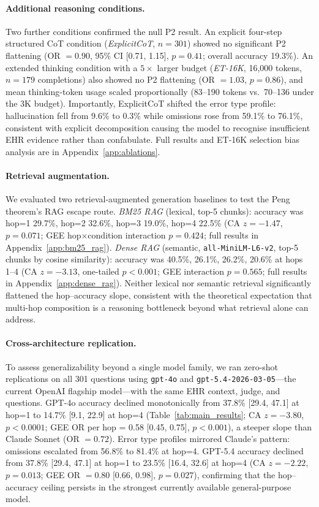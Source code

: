 \documentclass{article}
\begin{document}
\paragraph{Additional reasoning conditions.}
Two further conditions confirmed the null P2 result. An explicit four-step structured CoT condition (\textit{ExplicitCoT}, $n = 301$) showed no significant P2 flattening (OR $= 0.90$, 95\% CI [0.71, 1.15], $p = 0.41$; overall accuracy 19.3\%). An extended thinking condition with a $5\times$ larger budget (\textit{ET-16K}, 16{,}000 tokens, $n = 179$ completions) also showed no P2 flattening (OR $= 1.03$, $p = 0.86$), and mean thinking-token usage scaled proportionally (83--190 tokens vs.\ 70--136 under the 3K budget). Importantly, ExplicitCoT shifted the error type profile: hallucination fell from 9.6\% to 0.3\% while omissions rose from 59.1\% to 76.1\%, consistent with explicit decomposition causing the model to recognise insufficient EHR evidence rather than confabulate. Full results and ET-16K selection bias analysis are in Appendix~\ref{app:ablations}.

\paragraph{Retrieval augmentation.}
We evaluated two retrieval-augmented generation baselines to test the Peng theorem's RAG escape route.
\textit{BM25 RAG} (lexical, top-5 chunks): accuracy was hop=1 29.7\%, hop=2 32.6\%, hop=3 19.0\%, hop=4 22.5\% (CA $z = -1.47$, $p = 0.071$; GEE hop$\times$condition interaction $p = 0.424$; full results in Appendix~\ref{app:bm25_rag}).
\textit{Dense RAG} (semantic, \texttt{all-MiniLM-L6-v2}, top-5 chunks by cosine similarity): accuracy was 40.5\%, 26.1\%, 26.2\%, 20.6\% at hops 1--4 (CA $z = -3.13$, one-tailed $p < 0.001$; GEE interaction $p = 0.565$; full results in Appendix~\ref{app:dense_rag}).
Neither lexical nor semantic retrieval significantly flattened the hop--accuracy slope, consistent with the theoretical expectation that multi-hop composition is a reasoning bottleneck beyond what retrieval alone can address.

\paragraph{Cross-architecture replication.}
To assess generalizability beyond a single model family, we ran zero-shot replications on all 301 questions using \texttt{gpt-4o} and \texttt{gpt-5.4-2026-03-05}---the current OpenAI flagship model---with the same EHR context, judge, and questions. GPT-4o accuracy declined monotonically from 37.8\% [29.4, 47.1] at hop=1 to 14.7\% [9.1, 22.9] at hop=4 (Table~\ref{tab:main_results}; CA $z = -3.80$, $p < 0.0001$; GEE OR per hop = 0.58 [0.45, 0.75], $p < 0.001$), a steeper slope than Claude Sonnet (OR $= 0.72$). Error type profiles mirrored Claude's pattern: omissions escalated from 56.8\% to 81.4\% at hop=4. GPT-5.4 accuracy declined from 37.8\% [29.4, 47.1] at hop=1 to 23.5\% [16.4, 32.6] at hop=4 (CA $z = -2.22$, $p = 0.013$; GEE OR $= 0.80$ [0.66, 0.98], $p = 0.027$), confirming that the hop--accuracy ceiling persists in the strongest currently available general-purpose model.
\end{document}
